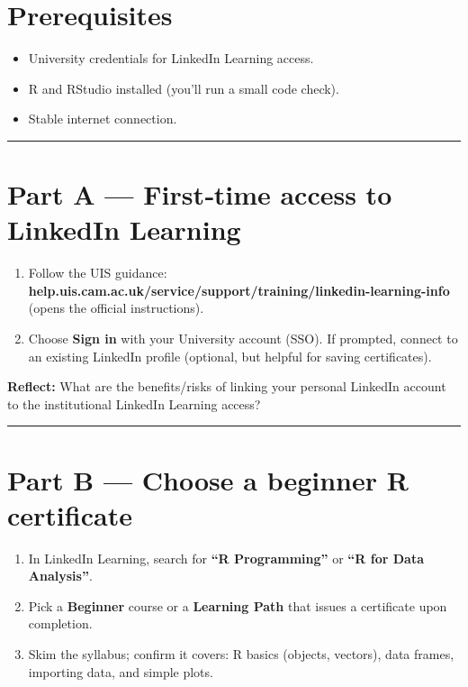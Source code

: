 \documentclass[
  letterpaper,
  DIV=11,
  numbers=noendperiod]{scrreprt}
\providecommand{\tightlist}{%
  \setlength{\itemsep}{0pt}\setlength{\parskip}{0pt}}
\begin{document}
\section{Prerequisites}\label{prerequisites}

\begin{itemize}
\tightlist
\item
  University credentials for LinkedIn Learning access.\\
\item
  R and RStudio installed (you'll run a small code check).\\
\item
  Stable internet connection.
\end{itemize}

\begin{center}\rule{0.5\linewidth}{0.5pt}\end{center}

\section{Part A --- First‑time access to LinkedIn
Learning}\label{part-a-firsttime-access-to-linkedin-learning}

\begin{enumerate}
\def\labelenumi{\arabic{enumi}.}
\tightlist
\item
  Follow the UIS guidance:
  \textbf{help.uis.cam.ac.uk/service/support/training/linkedin-learning-info}
  (opens the official instructions).\\
\item
  Choose \textbf{Sign in} with your University account (SSO). If
  prompted, connect to an existing LinkedIn profile (optional, but
  helpful for saving certificates).
\end{enumerate}

\textbf{Reflect:} What are the benefits/risks of linking your personal
LinkedIn account to the institutional LinkedIn Learning access?

\begin{center}\rule{0.5\linewidth}{0.5pt}\end{center}

\section{Part B --- Choose a beginner R
certificate}\label{part-b-choose-a-beginner-r-certificate}

\begin{enumerate}
\def\labelenumi{\arabic{enumi}.}
\tightlist
\item
  In LinkedIn Learning, search for \textbf{``R Programming''} or
  \textbf{``R for Data Analysis''}.\\
\item
  Pick a \textbf{Beginner} course or a \textbf{Learning Path} that
  issues a certificate upon completion.\\
\item
  Skim the syllabus; confirm it covers: R basics (objects, vectors),
  data frames, importing data, and simple plots.
\end{enumerate}
\end{document}
